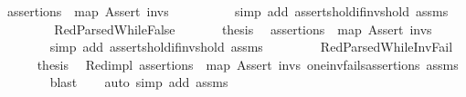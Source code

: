 \begin{isabellebody}
\ {\isacartoucheopen}assertions\ {\isacharequal}{\kern0pt}\ {\isacharparenleft}{\kern0pt}map\ Assert\ invs{\isacharparenright}{\kern0pt}{\isacartoucheclose}\ \ \isanewline
\ \ \ \ \ \ \isamarkupfalse%
\ {\isacharparenleft}{\kern0pt}simp\ add{\isacharcolon}{\kern0pt}\ asserts{\isacharunderscore}{\kern0pt}hold{\isacharunderscore}{\kern0pt}if{\isacharunderscore}{\kern0pt}invs{\isacharunderscore}{\kern0pt}hold\ assms{\isacharparenleft}{\kern0pt}{}{\isacharparenright}{\kern0pt}{\isacharparenright}{\kern0pt}\isanewline
\ \ \isamarkupfalse%
\isanewline
\ \ \ \ \isamarkupfalse%
\ RedParsedWhileFalse\ \isanewline
\ \ \ \ \isamarkupfalse%
\ {\isacharquery}{\kern0pt}thesis\ \isamarkupfalse%
\ {\isacartoucheopen}assertions\ {\isacharequal}{\kern0pt}\ {\isacharparenleft}{\kern0pt}map\ Assert\ invs{\isacharparenright}{\kern0pt}{\isacartoucheclose}\ \isanewline
\ \ \ \ \ \ \isamarkupfalse%
\ {\isacharparenleft}{\kern0pt}simp\ add{\isacharcolon}{\kern0pt}\ asserts{\isacharunderscore}{\kern0pt}hold{\isacharunderscore}{\kern0pt}if{\isacharunderscore}{\kern0pt}invs{\isacharunderscore}{\kern0pt}hold\ assms{\isacharparenleft}{\kern0pt}{}{\isacharparenright}{\kern0pt}{\isacharparenright}{\kern0pt}\isanewline
\ \ \isamarkupfalse%
\isanewline
\ \ \ \ \isamarkupfalse%
\ RedParsedWhile{\isacharunderscore}{\kern0pt}InvFail\ \isanewline
\ \ \ \ \isamarkupfalse%
\ {\isacharquery}{\kern0pt}thesis\ \isamarkupfalse%
\ Red{\isacharunderscore}{\kern0pt}impl\ {\isacartoucheopen}assertions\ {\isacharequal}{\kern0pt}\ map\ Assert\ invs{\isacartoucheclose}\ one{\isacharunderscore}{\kern0pt}inv{\isacharunderscore}{\kern0pt}fails{\isacharunderscore}{\kern0pt}assertions\ assms{\isacharparenleft}{\kern0pt}{}{\isacharparenright}{\kern0pt}\isanewline
\ \ \ \ \ \ \isamarkupfalse%
\ blast\isanewline
\ \ \isamarkupfalse%
\ {\isacharparenleft}{\kern0pt}auto\ simp\ add{\isacharcolon}{\kern0pt}\ assms{\isacharparenleft}{\kern0pt}{}{\isacharparenright}{\kern0pt}{\isacharparenright}{\kern0pt}\isanewline
{}\isamarkupfalse%
%
\endisatagproof
{\isafoldproof}%
%
\isadelimproof
%
\endisadelimproof
%
\isadelimdocument
%
\endisadelimdocument
%
\isatagdocument
%
\isamarkuptrue%
%
\endisatagdocument
{\isafolddocument}%
%
\isadelimdocument
%
\endisadelimdocument
%
\begin{isamarkuptext}%

\end{isamarkuptext}
\end{isabellebody}
